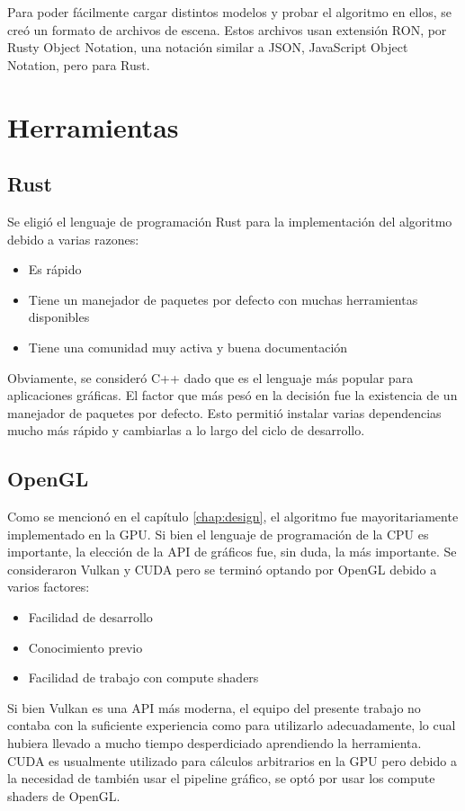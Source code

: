 Para poder fácilmente cargar distintos modelos y probar el algoritmo en ellos, se creó un formato de archivos de escena.
Estos archivos usan extensión RON, por Rusty Object Notation, una notación similar a JSON, JavaScript Object Notation, pero para Rust.


\section{Herramientas} %

\subsection{Rust}

Se eligió el lenguaje de programación Rust para la implementación del algoritmo debido a varias razones:
\begin{itemize}
    \item Es rápido
    \item Tiene un manejador de paquetes por defecto con muchas herramientas disponibles
    \item Tiene una comunidad muy activa y buena documentación
\end{itemize}

Obviamente, se consideró C++ dado que es el lenguaje más popular para aplicaciones gráficas.
El factor que más pesó en la decisión fue la existencia de un manejador de paquetes por defecto.
Esto permitió instalar varias dependencias mucho más rápido y cambiarlas a lo largo del ciclo de desarrollo.

\subsection{OpenGL}

Como se mencionó en el capítulo \ref{chap:design}, el algoritmo fue mayoritariamente implementado en la GPU.
Si bien el lenguaje de programación de la CPU es importante, la elección de la API de gráficos fue, sin duda, la más importante.
Se consideraron Vulkan y CUDA pero se terminó optando por OpenGL debido a varios factores:
\begin{itemize}
    \item Facilidad de desarrollo
    \item Conocimiento previo
    \item Facilidad de trabajo con compute shaders
\end{itemize}

Si bien Vulkan es una API más moderna, el equipo del presente trabajo no contaba con la suficiente experiencia como para utilizarlo adecuadamente, lo cual hubiera llevado a mucho tiempo desperdiciado aprendiendo la herramienta.
CUDA es usualmente utilizado para cálculos arbitrarios en la GPU pero debido a la necesidad de también usar el pipeline gráfico, se optó por usar los compute shaders de OpenGL.
